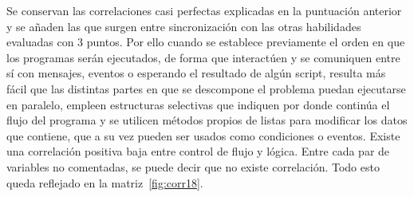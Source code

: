 \documentclass[a4paper, 12pt]{book}
\begin{document}
Se conservan las correlaciones casi perfectas explicadas en la puntuación anterior y se añaden las que surgen entre sincronización con las otras habilidades evaluadas con 3 puntos. Por ello cuando se establece previamente el orden en que los programas serán ejecutados, de forma que interactúen y se comuniquen entre sí con mensajes, eventos o esperando el resultado de algún script, resulta más fácil que las distintas partes en que se descompone el problema puedan ejecutarse en paralelo, empleen estructuras selectivas que indiquen por donde continúa el flujo del programa y se utilicen métodos propios de listas para modificar los datos que contiene, que a su vez pueden ser usados como condiciones o eventos. Existe una correlación positiva baja entre control de flujo y lógica. Entre cada par de variables no comentadas, se puede decir que no existe correlación. Todo esto queda reflejado en la matriz~\ref{fig:corr18}.
\end{document}

